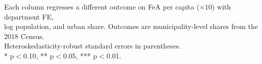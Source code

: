 \begin{table}[htbp]
   \par \raggedright 
   Each column regresses a different outcome on FeA per capita ($\times 10$) with department FE,\\
   log population, and urban share. Outcomes are municipality-level shares from the 2018 Census.\\
   Heteroskedasticity-robust standard errors in parentheses.\\
   * p$<$0.10, ** p$<$0.05, *** p$<$0.01.
\end{table}


